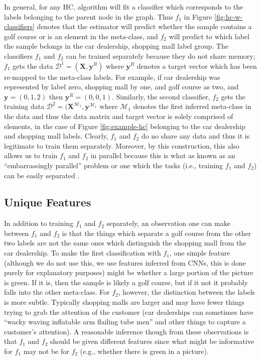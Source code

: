 \documentclass[../thesis.tex]{subfiles}
\begin{document}
In general, for any HC, algorithm will fit a classifier which corresponds to the
labels belonging to the parent node in the graph. Thus $f_1$ in Figure
\ref{fig:hc-w-classifiers} denotes that the estimator will predict whether the
sample contains a golf course or is an element in the meta-class, and $f_2$ will
predict to which label the sample belongs in the car dealership, shopping mall
label group. The classifiers $f_1$ and $f_2$ can be trained separately because
they do not share memory; $f_1$ gets the data $\mathcal{D}^1 = (\mathbf{X},
\mathbf{y}^R)$ where $\mathbf{y}^R$ denotes a target vector which has been
re-mapped to the meta-class labels. For example, if car dealership was
represented by label zero, shopping mall by one, and golf course as two, and
$\mathbf{y} = (0, 1, 2)$ then $\mathbf{y}^R = (0, 0, 1)$. Similarly, the second
classifier, $f_2$ gets the training data $\mathcal{D}^2 =
(\mathbf{X}^{\mathcal{M}_1}, \mathbf{y}^{\mathcal{M}_1}$ where $\mathcal{M}_1$
denotes the first inferred meta-class in the data and thus the data matrix and
target vector is solely comprised of elements, in the case of Figure
\ref{fig:example-hc} belonging to the car dealership and shopping mall labels.
Clearly, $f_1$ and $f_2$ do no share any data and thus it is legitimate to train
them separately. Moreover, by this construction, this also allows us to train
$f_1$ and $f_2$ in parallel because this is what as known as an ``embarrassingly
parallel'' problem or one which the tasks (i.e., training $f_1$ and $f_2$) can
be easily separated \cite{herlihy2012art}.

\subsection{Unique Features}
In addition to training $f_1$ and $f_2$ separately, an observation one can make
between $f_1$ and $f_2$ is that the things which separate a golf course from the
other two labels are not the same ones which distinguish the shopping mall from
the car dealership. To make the first classification with $f_1$, one simple
feature (although we do not use this, we use features inferred from CNNs, this
is done purely for explanatory purposes) might be whether a large portion of the
picture is green. If it is, then the sample is likely a golf course, but if it
not it probably falls into the other meta-class. For $f_2$, however, the
distinction between the labels is more subtle. Typically shopping malls are
larger and may have fewer things trying to grab the attention of the customer
(car dealerships can sometimes have ``wacky waving inflatable arm flailing tube
men'' \cite{wacky_wavy} and other things to capture a customer's attention). A
reasonable inference though from these observations is that $f_1$ and $f_2$
should be given different features since what might be informative for $f_1$ may
not be for $f_2$ (e.g., whether there is green in a picture).
\end{document}
